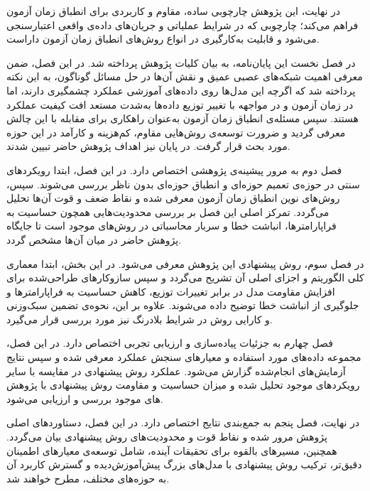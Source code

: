در نهایت، این پژوهش چارچوبی ساده، مقاوم و کاربردی برای انطباق زمان آزمون فراهم می‌کند؛ چارچوبی که در شرایط عملیاتی و جریان‌های داده‌ی واقعی اعتبارسنجی می‌شود و قابلیت به‌کارگیری در انواع روش‌های انطباق زمان آزمون داراست.


در فصل نخست این پایان‌نامه، به بیان کلیات پژوهش پرداخته شد. در این فصل، ضمن معرفی اهمیت شبکه‌های عصبی عمیق و نقش آن‌ها در حل مسائل گوناگون، به این نکته پرداخته شد که اگرچه این مدل‌ها روی داده‌های آموزشی عملکرد چشمگیری دارند، اما در زمان آزمون و در مواجهه با تغییر توزیع داده‌ها به‌شدت مستعد افت کیفیت عملکرد هستند. سپس مسئله‌ی انطباق زمان آزمون به‌عنوان راهکاری برای مقابله با این چالش معرفی گردید و ضرورت توسعه‌ی روش‌هایی مقاوم، کم‌هزینه و کارآمد در این حوزه مورد بحث قرار گرفت. در پایان نیز اهداف پژوهش حاضر تبیین شدند.

فصل دوم به مرور پیشینه‌ی پژوهشی اختصاص دارد. در این فصل، ابتدا رویکردهای سنتی در حوزه‌ی تعمیم حوزه‌ای و انطباق حوزه‌ای بدون ناظر بررسی می‌شوند. سپس، روش‌های نوین انطباق زمان آزمون معرفی شده و نقاط ضعف و قوت آن‌ها تحلیل می‌گردد. تمرکز اصلی این فصل بر بررسی محدودیت‌هایی همچون حساسیت به فراپارامترها، انباشت خطا و سربار محاسباتی در روش‌های موجود است تا جایگاه پژوهش حاضر در میان آن‌ها مشخص گردد.

در فصل سوم، روش پیشنهادی این پژوهش معرفی می‌شود. در این بخش، ابتدا معماری کلی الگوریتم و اجزای اصلی آن تشریح می‌گردد و سپس سازوکارهای طراحی‌شده برای افزایش مقاومت مدل در برابر تغییرات توزیع، کاهش حساسیت به فراپارامترها و جلوگیری از انباشت خطا توضیح داده می‌شوند. علاوه بر این، نحوه‌ی تضمین سبک‌وزنی و کارایی روش در شرایط بلادرنگ نیز مورد بررسی قرار می‌گیرد.

فصل چهارم به جزئیات پیاده‌سازی و ارزیابی تجربی اختصاص دارد. در این فصل، مجموعه داده‌های مورد استفاده و معیارهای سنجش عملکرد معرفی شده و سپس نتایج آزمایش‌های انجام‌شده گزارش می‌شود. عملکرد روش پیشنهادی در مقایسه با سایر رویکردهای موجود تحلیل شده و میزان حساسیت و مقاومت روش پیشنهادی با پژوهش های موجود بررسی و ارزیابی می‌شود.

در نهایت، فصل پنجم به جمع‌بندی نتایج اختصاص دارد. در این فصل، دستاوردهای اصلی پژوهش مرور شده و نقاط قوت و محدودیت‌های روش پیشنهادی بیان می‌گردد. همچنین، مسیرهای بالقوه برای تحقیقات آینده، شامل توسعه‌ی معیارهای اطمینان دقیق‌تر، ترکیب روش پیشنهادی با مدل‌های بزرگ پیش‌آموزش‌دیده و گسترش کاربرد آن به حوزه‌های مختلف، مطرح خواهند شد.
